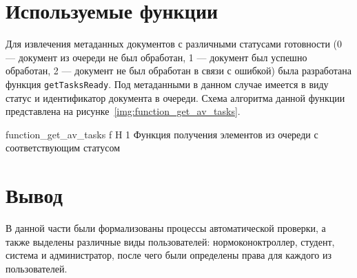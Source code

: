 \section{Используемые функции}
Для извлечения метаданных документов с различными статусами готовности (0 --- документ из очереди не был обработан, 1 --- документ был успешно обработан, 2 --- документ не был обработан в связи с ошибкой) была разработана функция \texttt{getTasksReady}. Под метаданными в данном случае имеется в виду статус и идентификатор документа в очереди. Схема алгоритма данной функции представлена на рисунке~\ref{img:function_get_av_tasks}.

{function_get_av_tasks} %
{f} %
{H} %
{1\textwidth} %
{Функция получения элементов из очереди с соответствующим статусом}





\section*{Вывод}
В данной части были формализованы процессы автоматической проверки, а также выделены различные виды пользователей: нормоконоктроллер, студент, система и администратор, после чего были определены права для каждого из пользователей.




